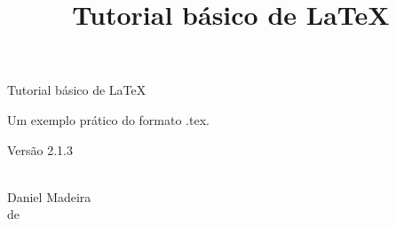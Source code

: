 \documentclass[a4paper,12pt,oneside]{book}
\title{Tutorial básico de \LaTeX} %
\author{\nomeautor} %
\date{\mesano} %
\newcommand{\nomeautor}{Daniel Madeira}
\newcommand{\mesano}{\DTMportugesmonthname{\the\month} de \the\year}
\newcommand{\versaomaior}{2}
\newcommand{\versaomenor}{1}
\newcommand{\versaodecorrecao}{3}
\newenvironment{folharosto}[1]
    {\begin{center}
        \vspace*{\fill}
        {\LARGE #1}\par
        \vspace{2cm}
    }
    {
        \vspace*{\fill}
        \\\large\nomeautor\\\vspace{0.8cm}\small\mesano
        \thispagestyle{empty}
        \renewcommand{\thepage}{rosto}
    \end{center}
    }
\begin{document}
\begin{titlepage}
    \maketitle %
    \renewcommand{\thepage}{capa} %
\end{titlepage}

\pagecolor{gray!5!yellow!5} %

\begin{folharosto}{Tutorial básico de \LaTeX}
Um exemplo prático do formato .tex.\par\vspace{1cm}
Versão \versaomaior.\versaomenor.\versaodecorrecao
\end{folharosto}
\end{document}

